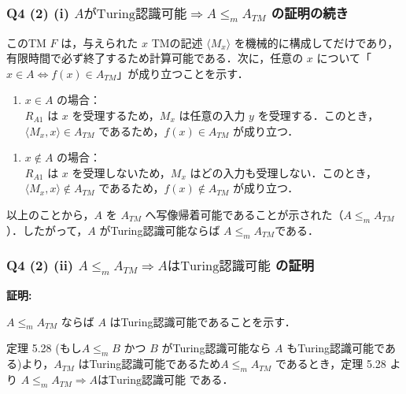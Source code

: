 \begin{frame}[fragile]
\frametitle{Q4 (2) \hspace{3mm} (i) $A \text{がTuring認識可能} \Rightarrow A \le_{m} A_{TM}$ の証明の続き}

このTM $F$ は，与えられた $x$ TMの記述 $\langle M_x \rangle$ を機械的に構成してだけであり，有限時間で必ず終了するため計算可能である．次に，任意の $x$ について「$x \in A \Leftrightarrow f(x) \in A_{TM}$」が成り立つことを示す．

\begin{enumerate}
  \item[・] $x \in A$ の場合： \\
$R_{A1}$ は $x$ を受理するため，$M_x$ は任意の入力 $y$ を受理する．このとき， $\langle M_x, x \rangle \in A_{TM}$ であるため，$f(x) \in A_{TM}$ が成り立つ．
\end{enumerate}

\begin{enumerate}
  \item[・] $x \notin A$ の場合： \\
$R_{A1}$ は $x$ を受理しないため，$M_x$ はどの入力も受理しない．このとき， $\langle M_x, x \rangle \notin A_{TM}$ であるため，$f(x) \notin A_{TM}$ が成り立つ．
\end{enumerate}

以上のことから，$A$ を $A_{TM}$ へ写像帰着可能であることが示された（$A \le_{m} A_{TM}$）．したがって，$A$ がTuring認識可能ならば $A \le_{m} A_{TM}$である．

\end{frame}



\begin{frame}[fragile]
\frametitle{Q4 (2) \hspace{3mm} (ii) $A \le_{m} A_{TM} \Rightarrow A \text{はTuring認識可能}$ の証明}

\textbf{証明:}

$A \le_{m} A_{TM}$ ならば $A$ はTuring認識可能であることを示す．

定理 5.28 (もし$A \le_{m} B$ かつ $B$ がTuring認識可能なら $A$ もTuring認識可能である)より，$A_{TM}$ はTuring認識可能であるため$A \le_{m} A_{TM}$ であるとき，定理 5.28 より $A \le_{m} A_{TM} \Rightarrow A \text{はTuring認識可能}$ である．

\end{frame}



